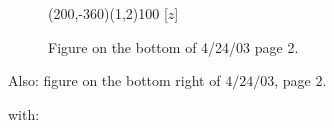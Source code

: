 \documentclass[12pt]{article}
\newcommand{\n}{\noindent}
\newcommand{\s}{\vspace{5mm}}
\begin{document}
\begin{figure}[htb]
\begin{egame}
\putbranch(200,-360)(1,2){100}
\ib{}{}[$z$]


%
\end{egame}
\hspace*{\fill}\s\s\s\s\s\s\s\s\s\s\s\s\s
\caption[]{Figure on the bottom of 4/24/03 page 2.}\label{f:fourteen}
\end{figure}





\begin{center}
Also: figure on the bottom right of $4/24/03$, page $2$.
\end{center}
\s
\n with:
\end{document}
